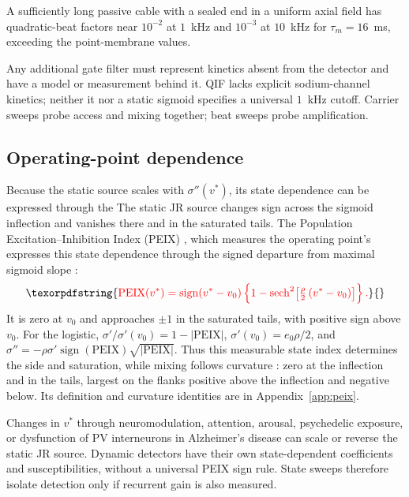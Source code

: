 \documentclass[11pt,a4paper]{article}
\newcommand{\Sig}{\sigma}
\providecommand{\DIFaddtex}[1]{{\protect\color{blue} \sf #1}} %
\providecommand{\DIFdeltex}[1]{{\protect\color{red} \scriptsize #1}} %
\providecommand{\DIFaddbegin}{} %
\providecommand{\DIFaddend}{} %
\providecommand{\DIFdelbegin}{} %
\providecommand{\DIFdelend}{} %
\providecommand{\DIFadd}[1]{\texorpdfstring{\DIFaddtex{#1}}{#1}} %
\providecommand{\DIFdel}[1]{\texorpdfstring{\DIFdeltex{#1}}{}} %
\begin{document}
A sufficiently long passive cable with a sealed end in a uniform axial field
has quadratic-beat factors near $10^{-2}$ at $1$~kHz and $10^{-3}$ at
$10$~kHz for $\tau_m=16$~ms, exceeding the point-membrane values.

Any additional gate filter must represent kinetics absent from the detector
and have a model or measurement behind it. QIF lacks explicit sodium-channel
kinetics; neither it nor a static sigmoid specifies a universal $1$~kHz cutoff.
\DIFdelbegin \DIFdel{Carrier sweeps probe access and mixing together; beat sweeps probe amplification.
}\DIFdelend

\subsection{Operating-point dependence}\label{sec:opp}
\DIFdelbegin \DIFdel{Because the static source scales with $\Sig''(v^*)$, its state dependence
can be expressed through the }\DIFdelend \DIFaddbegin \DIFadd{The static JR source changes sign across the sigmoid inflection and vanishes
there and in the saturated tails. The }\DIFaddend Population Excitation--Inhibition Index
(PEIX) \cite{ruffini2025cfc} \DIFdelbegin \DIFdel{, which measures the operating point's }\DIFdelend \DIFaddbegin \DIFadd{expresses this state dependence through the }\DIFaddend signed
departure from maximal sigmoid slope\DIFdelbegin \DIFdel{:
}\begin{displaymath}
\DIFdel{\mathrm{PEIX}(v^*)=\operatorname{sign}(v^*-v_0)
\left\{1-\operatorname{sech}^2\!\Big[\tfrac{\rho}{2}\,(v^*-v_0)\Big]\right\}.
}\end{displaymath}%
\DIFdel{It is zero at $v_0$ and approaches $\pm1$ in the saturated tails, with
positive sign above $v_0$. For the logistic,
$\Sig'/\Sig'(v_0)=1-|\mathrm{PEIX}|$}\DIFdelend , \DIFdelbegin \DIFdel{$\Sig'(v_0)=e_0\rho/2$, and $\Sig''=-\rho\Sig'\operatorname{sign}(\mathrm{PEIX})\sqrt{|\mathrm{PEIX}|}$. Thus this measurable state index determines the side and saturation, while
mixing follows curvature : zero at the inflection and in the tails, largest
on the flanks}\DIFdelend \DIFaddbegin \DIFadd{positive above the inflection and negative
below. Its definition and curvature identities are in Appendix~\ref{app:peix}}\DIFaddend .

Changes in $v^*$ through neuromodulation, attention, arousal, psychedelic
exposure, or dysfunction of PV interneurons in Alzheimer's disease can scale or
reverse the static JR source. Dynamic detectors have their own state-dependent
coefficients and susceptibilities, without a universal PEIX sign rule.
State sweeps therefore isolate detection only if recurrent gain is also measured.
\end{document}
